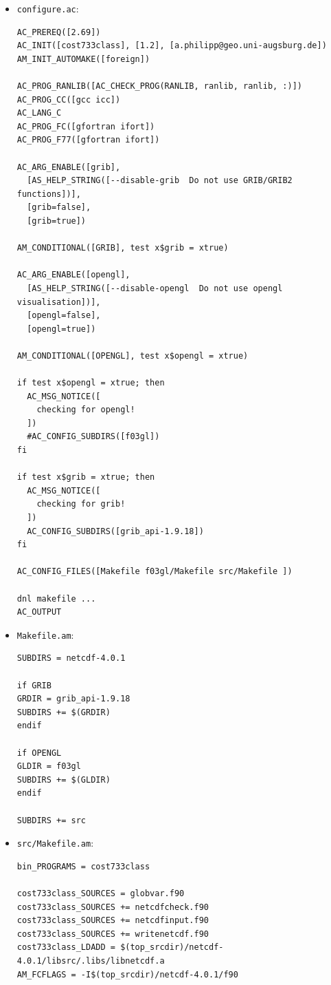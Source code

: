 \documentclass[12pt, oneside, a4paper, headsepline, plainheadsepline]{scrbook}
\begin{document}
\begin{itemize}
\item \texttt{configure.ac}:
\vspace{1em}
\begin{lstlisting}
AC_PREREQ([2.69])
AC_INIT([cost733class], [1.2], [a.philipp@geo.uni-augsburg.de])
AM_INIT_AUTOMAKE([foreign])

AC_PROG_RANLIB([AC_CHECK_PROG(RANLIB, ranlib, ranlib, :)])
AC_PROG_CC([gcc icc])
AC_LANG_C
AC_PROG_FC([gfortran ifort])
AC_PROG_F77([gfortran ifort])

AC_ARG_ENABLE([grib],
  [AS_HELP_STRING([--disable-grib  Do not use GRIB/GRIB2 functions])],
  [grib=false],
  [grib=true])

AM_CONDITIONAL([GRIB], test x$grib = xtrue)

AC_ARG_ENABLE([opengl],
  [AS_HELP_STRING([--disable-opengl  Do not use opengl visualisation])],
  [opengl=false],
  [opengl=true])

AM_CONDITIONAL([OPENGL], test x$opengl = xtrue)

if test x$opengl = xtrue; then
  AC_MSG_NOTICE([
    checking for opengl!
  ])
  #AC_CONFIG_SUBDIRS([f03gl])
fi

if test x$grib = xtrue; then
  AC_MSG_NOTICE([
    checking for grib!
  ])
  AC_CONFIG_SUBDIRS([grib_api-1.9.18])
fi

AC_CONFIG_FILES([Makefile f03gl/Makefile src/Makefile ])

dnl makefile ...
AC_OUTPUT
\end{lstlisting}

\item \verb+Makefile.am+:
\begin{lstlisting}
SUBDIRS = netcdf-4.0.1

if GRIB
GRDIR = grib_api-1.9.18
SUBDIRS += $(GRDIR)
endif

if OPENGL
GLDIR = f03gl
SUBDIRS += $(GLDIR)
endif

SUBDIRS += src
\end{lstlisting}

\item \verb+src/Makefile.am+:
\begin{lstlisting}
bin_PROGRAMS = cost733class

cost733class_SOURCES = globvar.f90
cost733class_SOURCES += netcdfcheck.f90 
cost733class_SOURCES += netcdfinput.f90 
cost733class_SOURCES += writenetcdf.f90 
cost733class_LDADD = $(top_srcdir)/netcdf-4.0.1/libsrc/.libs/libnetcdf.a 
AM_FCFLAGS = -I$(top_srcdir)/netcdf-4.0.1/f90


\end{lstlisting}
\end{itemize}
\end{document}
